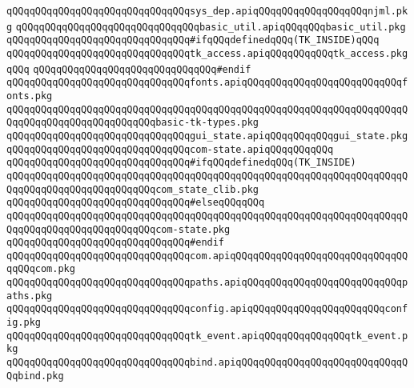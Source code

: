 \verb|qQQqqQQqqQQqqQQqqQQqqQQqqQQqqQQqsys_dep.apiqQQqqQQqqQQqqQQqqQQqnjml.pkg|\newline
\verb|qQQqqQQqqQQqqQQqqQQqqQQqqQQqqQQqbasic_util.apiqQQqqQQqbasic_util.pkg|\newline
\newline
\verb|qQQqqQQqqQQqqQQqqQQqqQQqqQQqqQQq#ifqQQqdefinedqQQq(TK_INSIDE)qQQq|\newline
\verb|qQQqqQQqqQQqqQQqqQQqqQQqqQQqqQQqtk_access.apiqQQqqQQqqQQqtk_access.pkgqQQq|\newline
\verb|qQQqqQQqqQQqqQQqqQQqqQQqqQQqqQQq#endif|\newline
\newline
\verb|qQQqqQQqqQQqqQQqqQQqqQQqqQQqqQQqfonts.apiqQQqqQQqqQQqqQQqqQQqqQQqqQQqfonts.pkg|\newline
\verb|qQQqqQQqqQQqqQQqqQQqqQQqqQQqqQQqqQQqqQQqqQQqqQQqqQQqqQQqqQQqqQQqqQQqqQQqqQQqqQQqqQQqqQQqqQQqqQQqbasic-tk-types.pkg|\newline
\verb|qQQqqQQqqQQqqQQqqQQqqQQqqQQqqQQqgui_state.apiqQQqqQQqqQQqgui_state.pkg|\newline
\verb|qQQqqQQqqQQqqQQqqQQqqQQqqQQqqQQqcom-state.apiqQQqqQQqqQQq|\newline
\newline
\verb|qQQqqQQqqQQqqQQqqQQqqQQqqQQqqQQq#ifqQQqdefinedqQQq(TK_INSIDE)|\newline
\verb|qQQqqQQqqQQqqQQqqQQqqQQqqQQqqQQqqQQqqQQqqQQqqQQqqQQqqQQqqQQqqQQqqQQqqQQqqQQqqQQqqQQqqQQqqQQqqQQqcom_state_clib.pkg|\newline
\verb|qQQqqQQqqQQqqQQqqQQqqQQqqQQqqQQq#elseqQQqqQQq|\newline
\verb|qQQqqQQqqQQqqQQqqQQqqQQqqQQqqQQqqQQqqQQqqQQqqQQqqQQqqQQqqQQqqQQqqQQqqQQqqQQqqQQqqQQqqQQqqQQqqQQqcom-state.pkg|\newline
\verb|qQQqqQQqqQQqqQQqqQQqqQQqqQQqqQQq#endif|\newline
\newline
\verb|qQQqqQQqqQQqqQQqqQQqqQQqqQQqqQQqcom.apiqQQqqQQqqQQqqQQqqQQqqQQqqQQqqQQqqQQqcom.pkg|\newline
\verb|qQQqqQQqqQQqqQQqqQQqqQQqqQQqqQQqpaths.apiqQQqqQQqqQQqqQQqqQQqqQQqqQQqpaths.pkg|\newline
\verb|qQQqqQQqqQQqqQQqqQQqqQQqqQQqqQQqconfig.apiqQQqqQQqqQQqqQQqqQQqqQQqconfig.pkg|\newline
\verb|qQQqqQQqqQQqqQQqqQQqqQQqqQQqqQQqtk_event.apiqQQqqQQqqQQqqQQqtk_event.pkg|\newline
\verb|qQQqqQQqqQQqqQQqqQQqqQQqqQQqqQQqbind.apiqQQqqQQqqQQqqQQqqQQqqQQqqQQqqQQqbind.pkg|\newline
